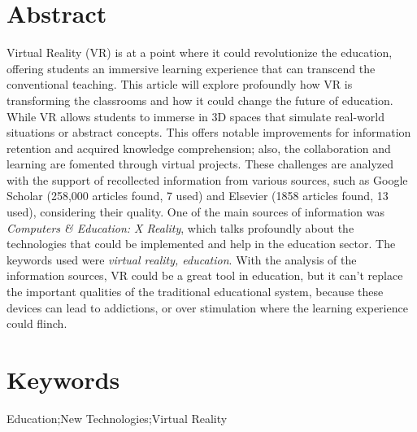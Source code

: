 \documentclass[11pt]{article}
\begin{document}
\begin{tcolorbox}[colback=introblock,colframe=introblock]
\section*{\fontsize{10}{12}\barial Abstract}
      {\fontsize{10}{12}Virtual Reality (VR) is at a point where it could revolutionize the education, offering students an immersive learning experience that can transcend the conventional teaching. This article will explore profoundly how VR is transforming the classrooms and how it could change the future of education. While VR allows students to immerse in 3D spaces that simulate real-world situations or abstract concepts. This offers notable improvements for information retention and acquired knowledge comprehension; also, the collaboration and learning are fomented through virtual projects. These challenges are analyzed with the support of recollected information from various sources, such as Google Scholar (258,000 articles found, 7 used) and Elsevier (1858 articles found, 13 used), considering their quality. One of the main sources of information was \textit{Computers \& Education: X Reality}, which talks profoundly about the technologies that could be implemented and help in the education sector. The keywords used were \textit{virtual reality, education}. With the analysis of the information sources, VR could be a great tool in education, but it can't replace the important qualities of the traditional educational system, because these devices can lead to addictions, or over stimulation where the learning experience could flinch.}

\section*{\fontsize{10}{12}\barial Keywords}
   {\fontsize{10}{12}Education;New Technologies;Virtual Reality}
\end{tcolorbox}



\printbibliography
\end{document}
